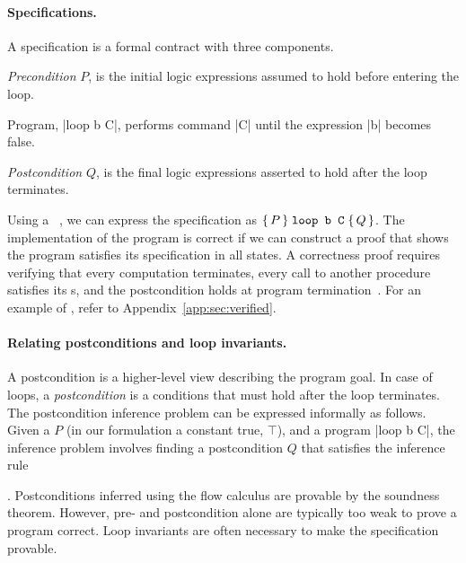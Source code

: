 \paragraph*{Specifications.}
A {specification} is a formal contract with three components.
\begin{enumerate*}
    \item \emph{Precondition} \(P\), is the initial logic expressions assumed to hold before entering the loop.
    \item Program, \pr|loop b C|, performs command \pr|C| until the expression \pr|b| becomes false.
    \item \emph{Postcondition} \(Q\), is the final logic expressions asserted to hold after the loop terminates.
\end{enumerate*}
Using a ~\cite{hoare1969}, we can express the specification as \(\Hoare{P}{\prm{loop b C}}{Q}\).
The implementation of the program is correct if we can construct a proof that shows the program satisfies its specification in all states.
A correctness proof requires verifying that every computation terminates, every call to another procedure satisfies its s, and the postcondition holds at program termination~\cite{furia2010}.
For an example of , refer to Appendix~\ref{app:sec:verified}.

\paragraph*{Relating postconditions and loop invariants.}
A postcondition is a higher-level view describing the program goal.
In case of loops, a \emph{postcondition} is a conditions that must hold after the loop terminates.
The postcondition inference problem can be expressed informally as follows.
Given a  \(P\) (in our formulation a constant true, \(\top\)), and a program \pr|loop b C|,
the inference problem involves finding a postcondition \(Q\) that satisfies the inference rule
\begin{prooftree} %
\end{prooftree}.
Postconditions inferred using the flow calculus are provable by the soundness theorem.
However, pre- and postcondition alone are typically too weak to prove a program correct.
Loop invariants are often necessary to make the specification provable.

